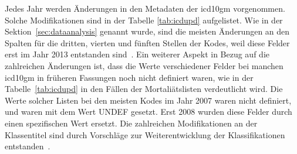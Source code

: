 Jedes Jahr werden Änderungen in den Metadaten der \ac{icd10gm} vorgenommen. Solche Modifikationen sind in der Tabelle \ref{tab:icdupd} aufgelistet. Wie in der Sektion~\ref{sec:dataanalysis} genannt wurde, sind die meisten Änderungen an den Spalten für die dritten, vierten und fünften Stellen  der Kodes, weil diese Felder erst im Jahr 2013 entstanden sind~\cite{readme13}. Ein weiterer Aspekt in Bezug auf die zahlreichen Änderungen ist, dass die Werte verschiedener Felder bei manchen \ac{icd10gm} in früheren Fassungen noch nicht definiert waren, wie in der Tabelle~\ref{tab:icdupd} in den Fällen der Mortaliätslisten verdeutlicht wird. Die Werte solcher Listen bei den meisten Kodes im Jahr 2007 waren nicht definiert, und waren mit dem Wert \glqq\textsf{UNDEF}\grqq{} gesetzt. Erst 2008 wurden diese Felder durch einen spezifischen Wert ersetzt. Die zahlreichen Modifikationen an der Klassentitel sind durch Vorschläge zur Weiterentwicklung der Klassifikationen entstanden~\cite{diab09, komm14}. 


